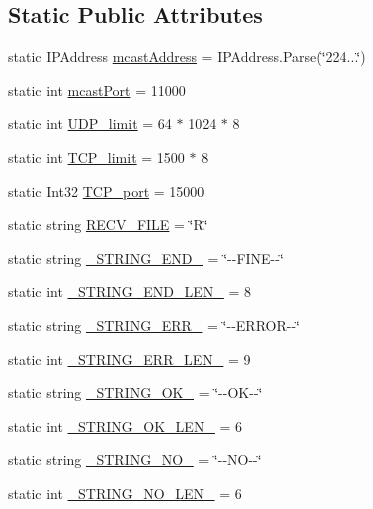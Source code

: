 \subsection*{Static Public Attributes}
\begin{DoxyCompactItemize}
\item 
static I\+P\+Address \hyperlink{classtest_1_1_networking_a391089d817b8ca98395fa1c4547b8743}{mcast\+Address} = I\+P\+Address.\+Parse(\char`\"{}224...\char`\"{})
\item 
static int \hyperlink{classtest_1_1_networking_ab1e07a45854e6fea5a090ae56284a90a}{mcast\+Port} = 11000
\item 
static int \hyperlink{classtest_1_1_networking_a8b2a1dc1555555144e879a44dcfef91c}{U\+D\+P\+\_\+limit} = 64 $\ast$ 1024 $\ast$ 8
\item 
static int \hyperlink{classtest_1_1_networking_a7deb2341c6f1ca3b5a344478ff2efdd9}{T\+C\+P\+\_\+limit} = 1500 $\ast$ 8
\item 
static Int32 \hyperlink{classtest_1_1_networking_a73381b49fee4647d3d3187f5e870b021}{T\+C\+P\+\_\+port} = 15000
\item 
static string \hyperlink{classtest_1_1_networking_a32173d0b79556684c3ea4e4d1e0b2112}{R\+E\+C\+V\+\_\+\+F\+I\+LE} = \char`\"{}R\char`\"{}
\item 
static string \hyperlink{classtest_1_1_networking_ad23f8af4733ba83197da4d5fa8de63ec}{\+\_\+\+S\+T\+R\+I\+N\+G\+\_\+\+E\+N\+D\+\_\+} = \char`\"{}-\/-\/F\+I\+NE-\/-\/\char`\"{}
\item 
static int \hyperlink{classtest_1_1_networking_af112b673970446c15503443f755f2218}{\+\_\+\+S\+T\+R\+I\+N\+G\+\_\+\+E\+N\+D\+\_\+\+L\+E\+N\+\_\+} = 8
\item 
static string \hyperlink{classtest_1_1_networking_abbb82f1fc0f0f2292f205666c6223128}{\+\_\+\+S\+T\+R\+I\+N\+G\+\_\+\+E\+R\+R\+\_\+} = \char`\"{}-\/-\/E\+R\+R\+OR-\/-\/\char`\"{}
\item 
static int \hyperlink{classtest_1_1_networking_ab05cf8f95c11620363cc8cdefbf425ba}{\+\_\+\+S\+T\+R\+I\+N\+G\+\_\+\+E\+R\+R\+\_\+\+L\+E\+N\+\_\+} = 9
\item 
static string \hyperlink{classtest_1_1_networking_acf5484f456124cc64b8f376487a82793}{\+\_\+\+S\+T\+R\+I\+N\+G\+\_\+\+O\+K\+\_\+} = \char`\"{}-\/-\/OK-\/-\/\char`\"{}
\item 
static int \hyperlink{classtest_1_1_networking_a293e2c6c6d50e1080f94215a25c6f2a8}{\+\_\+\+S\+T\+R\+I\+N\+G\+\_\+\+O\+K\+\_\+\+L\+E\+N\+\_\+} = 6
\item 
static string \hyperlink{classtest_1_1_networking_a97cf1b3f12a95383a2826a9c4c7b50aa}{\+\_\+\+S\+T\+R\+I\+N\+G\+\_\+\+N\+O\+\_\+} = \char`\"{}-\/-\/NO-\/-\/\char`\"{}
\item 
static int \hyperlink{classtest_1_1_networking_abe9d846f52389baf827e35367ceb72a8}{\+\_\+\+S\+T\+R\+I\+N\+G\+\_\+\+N\+O\+\_\+\+L\+E\+N\+\_\+} = 6
\end{DoxyCompactItemize}


